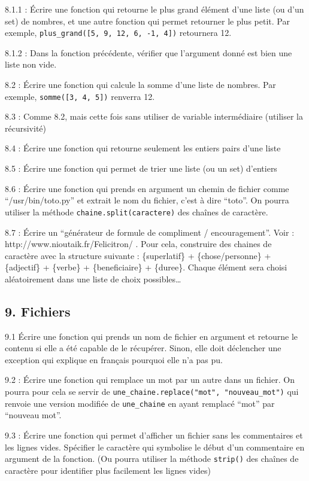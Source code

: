 \documentclass[]{article}
\begin{document}
8.1.1 : Écrire une fonction qui retourne le plus grand élément d'une
liste (ou d'un set) de nombres, et une autre fonction qui permet
retourner le plus petit. Par exemple,
\texttt{plus\_grand({[}5,\ 9,\ 12,\ 6,\ -1,\ 4{]})} retournera 12.

8.1.2 : Dans la fonction précédente, vérifier que l'argument donné est
bien une liste non vide.

8.2 : Écrire une fonction qui calcule la somme d'une liste de nombres.
Par exemple, \texttt{somme({[}3,\ 4,\ 5{]})} renverra 12.

8.3 : Comme 8.2, mais cette fois sans utiliser de variable intermédiaire
(utiliser la récursivité)

8.4 : Écrire une fonction qui retourne seulement les entiers pairs d'une
liste

8.5 : Écrire une fonction qui permet de trier une liste (ou un set)
d'entiers

8.6 : Écrire une fonction qui prends en argument un chemin de fichier
comme ``/usr/bin/toto.py'' et extrait le nom du fichier, c'est à dire
``toto''. On pourra utiliser la méthode \texttt{chaine.split(caractere)}
des chaînes de caractère.

8.7 : Écrire un ``générateur de formule de compliment / encouragement''.
Voir : http://www.nioutaik.fr/Felicitron/ . Pour cela, construire des
chaines de caractère avec la structure suivante : \{superlatif\} +
\{chose/personne\} + \{adjectif\} + \{verbe\} + \{beneficiaire\} +
\{duree\}. Chaque élément sera choisi aléatoirement dans une liste de
choix possibles\ldots{}

\hypertarget{fichiers}{%
\subsection{9. Fichiers}\label{fichiers}}

9.1 Écrire une fonction qui prends un nom de fichier en argument et
retourne le contenu si elle a été capable de le récupérer. Sinon, elle
doit déclencher une exception qui explique en français pourquoi elle n'a
pas pu.

9.2 : Écrire une fonction qui remplace un mot par un autre dans un
fichier. On pourra pour cela se servir de
\texttt{une\_chaine.replace("mot",\ "nouveau\_mot")} qui renvoie une
version modifiée de \texttt{une\_chaine} en ayant remplacé ``mot'' par
``nouveau mot''.

9.3 : Écrire une fonction qui permet d'afficher un fichier sans les
commentaires et les lignes vides. Spécifier le caractère qui symbolise
le début d'un commentaire en argument de la fonction. (Ou pourra
utiliser la méthode \texttt{strip()} des chaînes de caractère pour
identifier plus facilement les lignes vides)
\end{document}
